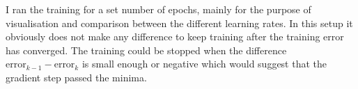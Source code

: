 \documentclass{article}
\begin{document}
I ran the training for a set number of epochs, mainly for the purpose of visualisation and comparison between the different learning rates. In this setup it obviously does not make any difference to keep training after the training error has converged. The training could be stopped when the difference $\text{error}_{k-1} - \text{error}_k$ is small enough or negative which would suggest that the gradient step passed the minima.
\end{document}
